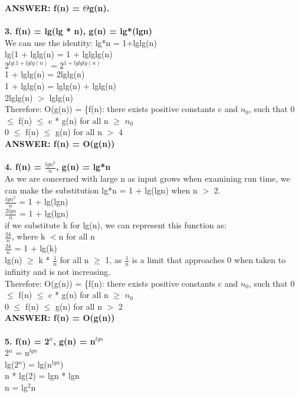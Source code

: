 \documentclass[fleqn]{article}
\begin{document}
\textbf{ANSWER: f(n) = $\Theta$g(n).}\\\\
\textbf{3. f(n) = lg(lg * n), g(n) = lg*(lgn)}\\
We can use the identity: lg*n = 1+lglg(n)\\
lg(1 + lglg(n) = 1 + lglglg(n)\\
$2^{lg(1 + lglg(n)} = 2^{1 + lglglg(n)}$\\
1 + lglg(n) = 2lglg(n)\\
1 + lglg(n) = lglg(n) + lglg(n)\\
2lglg(n) $>$ lglg(n)\\
Therefore: O(g(n)) = \{f(n): there exists positive constants c and  $n_{0}$, such that 0 $\le$ f(n) $\le$ c * g(n) for all n $\ge$ $n_{0}$\\
0 $\le$ f(n) $\le$ g(n) for all n $>$ $4$\\
\textbf{ANSWER: f(n) = O(g(n))}\\\\
\textbf{4. f(n) = $\frac{lgn^{2}}{n}$, g(n) = lg*n}\\
As we are concerned with large n as input grows when examining run time, we can make the substitution lg*n = 1 + lg(lgn) when n $>$ 2.\\
$\frac{lgn^{2}}{n}$ = 1 + lg(lgn)\\
$\frac{2lgn}{n}$ = 1 + lg(lgn)\\
if we substitute k for lg(n), we can represent this function as:\\
$\frac{2k}{n}$, where k $<$n for all n\\
$\frac{2k}{n}$ = 1 + lg(k)\\
lg(n) $\ge$ k * $\frac{1}{n}$ for all n $\ge$ 1, as $\frac{1}{n}$ is a limit that approaches 0 when taken to infinity and is not increasing.\\
Therefore: O(g(n)) = \{f(n): there exists positive constants c and  $n_{0}$, such that 0 $\le$ f(n) $\le$ c * g(n) for all n $\ge$ $n_{0}$\\
0 $\le$ f(n) $\le$ g(n) for all n $>$ $2$\\
\textbf{ANSWER: f(n) = O(g(n))}\\\\
\textbf{5. f(n) = 2$^{n}$, g(n) = n$^{lgn}$}\\
2$^{n}$ = n$^{lgn}$\\
lg(2$^{n}$) = lg(n$^{lgn}$)\\
n * lg(2) = lgn * lgn\\
n = lg$^{2}$n\\
\end{document}
